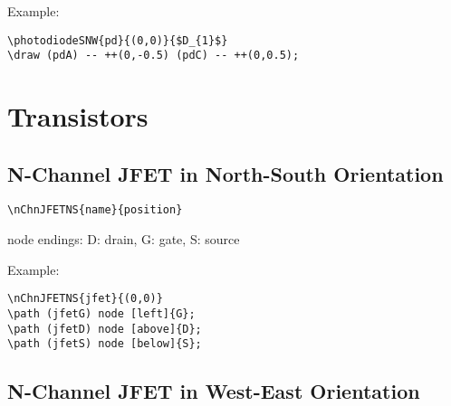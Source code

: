 \documentclass[parskip=full]{scrartcl}
\begin{document}
Example:\\
\begin{minipage}{0.8\textwidth}
\begin{verbatim}
\photodiodeSNW{pd}{(0,0)}{$D_{1}$}
\draw (pdA) -- ++(0,-0.5) (pdC) -- ++(0,0.5);
\end{verbatim}
\end{minipage}
\begin{minipage}{0.19\textwidth}
\end{minipage}

\section{Transistors}

\subsection{N-Channel JFET in North-South Orientation}

\begin{verbatim}
\nChnJFETNS{name}{position}
\end{verbatim}
node endings: D: drain, G: gate, S: source

Example:\\
\begin{minipage}{0.8\textwidth}
\begin{verbatim}
\nChnJFETNS{jfet}{(0,0)}
\path (jfetG) node [left]{G};
\path (jfetD) node [above]{D};
\path (jfetS) node [below]{S};
\end{verbatim}
\end{minipage}
\begin{minipage}{0.19\textwidth}
\end{minipage}

\subsection{N-Channel JFET in West-East Orientation}
\end{document}
